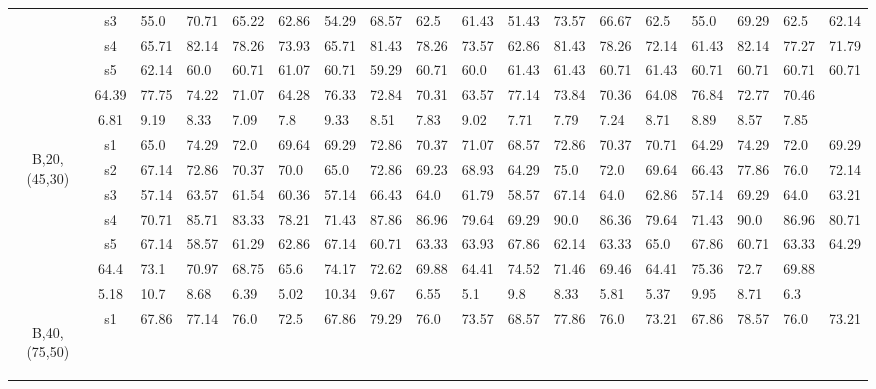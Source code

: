 \begin{table}[h]
{\begin{tabular}{cc|llll|llll|llll|llll}
 & s3 & 55.0 & 70.71 & 65.22 & 62.86 & 54.29 & 68.57 & 62.5 & 61.43 & 51.43 & 73.57 & 66.67 & 62.5 & 55.0 & 69.29 & 62.5 & 62.14 \\
 & s4 & 65.71 & 82.14 & 78.26 & 73.93 & 65.71 & 81.43 & 78.26 & 73.57 & 62.86 & 81.43 & 78.26 & 72.14 & 61.43 & 82.14 & 77.27 & 71.79 \\
 & s5 & 62.14 & 60.0 & 60.71 & 61.07 & 60.71 & 59.29 & 60.71 & 60.0 & 61.43 & 61.43 & 60.71 & 61.43 & 60.71 & 60.71 & 60.71 & 60.71 \\
\rowcolor{lightgray!50}\multicolumn{2}{r|}{avg} & 64.39 & 77.75 & 74.22 & 71.07 & 64.28 & 76.33 & 72.84 & 70.31 & 63.57 & 77.14 & 73.84 & 70.36 & 64.08 & 76.84 & 72.77 & 70.46 \\
\rowcolor{lightgray!50}\multicolumn{2}{r|}{std} & 6.81 & 9.19 & 8.33 & 7.09 & 7.8 & 9.33 & 8.51 & 7.83 & 9.02 & 7.71 & 7.79 & 7.24 & 8.71 & 8.89 & 8.57 & 7.85 \\
\multirow{6}{*}{\begin{sideways}B,20,(45,30)\end{sideways}} & s1 & 65.0 & 74.29 & 72.0 & 69.64 & 69.29 & 72.86 & 70.37 & 71.07 & 68.57 & 72.86 & 70.37 & 70.71 & 64.29 & 74.29 & 72.0 & 69.29 \\
 & s2 & 67.14 & 72.86 & 70.37 & 70.0 & 65.0 & 72.86 & 69.23 & 68.93 & 64.29 & 75.0 & 72.0 & 69.64 & 66.43 & 77.86 & 76.0 & 72.14 \\
 & s3 & 57.14 & 63.57 & 61.54 & 60.36 & 57.14 & 66.43 & 64.0 & 61.79 & 58.57 & 67.14 & 64.0 & 62.86 & 57.14 & 69.29 & 64.0 & 63.21 \\
 & s4 & 70.71 & 85.71 & 83.33 & 78.21 & 71.43 & 87.86 & 86.96 & 79.64 & 69.29 & 90.0 & 86.36 & 79.64 & 71.43 & 90.0 & 86.96 & 80.71 \\
 & s5 & 67.14 & 58.57 & 61.29 & 62.86 & 67.14 & 60.71 & 63.33 & 63.93 & 67.86 & 62.14 & 63.33 & 65.0 & 67.86 & 60.71 & 63.33 & 64.29 \\
\rowcolor{lightgray!50}\multicolumn{2}{r|}{avg} & 64.4 & 73.1 & 70.97 & 68.75 & 65.6 & 74.17 & 72.62 & 69.88 & 64.41 & 74.52 & 71.46 & 69.46 & 64.41 & 75.36 & 72.7 & 69.88 \\
\rowcolor{lightgray!50}\multicolumn{2}{r|}{std} & 5.18 & 10.7 & 8.68 & 6.39 & 5.02 & 10.34 & 9.67 & 6.55 & 5.1 & 9.8 & 8.33 & 5.81 & 5.37 & 9.95 & 8.71 & 6.3 \\
\multirow{6}{*}{\begin{sideways}B,40,(75,50)\end{sideways}} & s1 & 67.86 & 77.14 & 76.0 & 72.5 & 67.86 & 79.29 & 76.0 & 73.57 & 68.57 & 77.86 & 76.0 & 73.21 & 67.86 & 78.57 & 76.0 & 73.21 \\

\end{tabular}}
\end{table}
